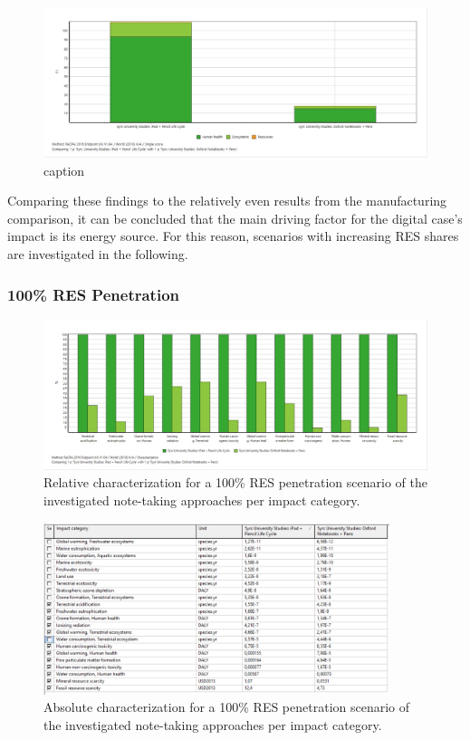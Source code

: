 \begin{figure}[H]
    \centering
    \includegraphics[width=\textwidth]{images/RES_50/Single_Score_RES_50.JPG}
    \caption{caption}\label{fig:single_score_RES50}
\end{figure}

Comparing these findings to the relatively even results from the manufacturing comparison, it can be concluded that the main driving factor for the digital case's impact is its energy source. For this reason, scenarios with increasing RES shares are investigated in the following.

\subsubsection{100\% RES Penetration}

\begin{figure}[H]
    \centering
    \includegraphics[width=\textwidth]{images/RES_100/Characterization_RES_100.JPG}
    \caption{Relative characterization for a 100\% RES penetration scenario of the investigated note-taking approaches per impact category.}\label{fig:characterization_RES_100}
\end{figure}

\begin{figure}[H]
    \centering
    \includegraphics[width=0.9\textwidth]{images/RES_100/Characterization_Table_RES_100.PNG}
    \caption{Absolute characterization for a 100\% RES penetration scenario of the investigated note-taking approaches per impact category.}\label{fig:characterization_table_RES_100}
\end{figure}

